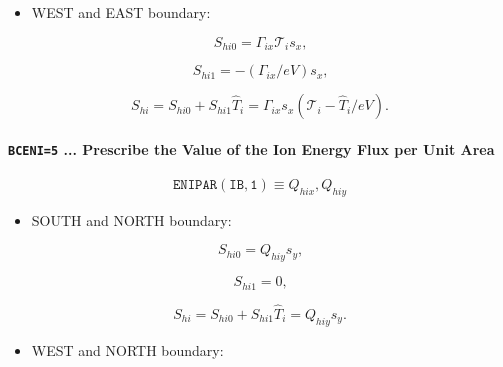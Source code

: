 \documentclass[11pt]{article}
\begin{document}
\bigskip

\begin{itemize}
\item  WEST and EAST boundary:
\end{itemize}

\bigskip

\begin{equation}
S_{hi0}=\mathcal{\Gamma}_{ix}\mathcal{T}_{i}s_{x}\text{,}   \label{c270}
\end{equation}

\begin{equation}
S_{hi1}=-\left( \mathcal{\Gamma}_{ix}/eV\right) s_{x}\text{,}   \label{c271}
\end{equation}

\begin{equation}
S_{hi}=S_{hi0}+S_{hi1}\widehat{T}_{i}=\mathcal{\Gamma}_{ix}s_{x}\left( 
\mathcal{T}_{i}-\widehat{T}_{i}/eV\right) \text{.}   \label{c272}
\end{equation}

\bigskip

\paragraph{\texttt{BCENI=5} ... Prescribe the Value of the Ion Energy Flux
per Unit Area}

\bigskip

\begin{equation*}
\mathtt{ENIPAR(IB,1)}\equiv Q_{hix},Q_{hiy}
\end{equation*}

\bigskip

\begin{itemize}
\item  SOUTH and NORTH boundary:
\end{itemize}

\begin{equation}
S_{hi0}=Q_{hiy}s_{y}\text{,}   \label{c273}
\end{equation}

\begin{equation}
S_{hi1}=0\text{,}   \label{c274}
\end{equation}

\begin{equation}
S_{hi}=S_{hi0}+S_{hi1}\widehat{T}_{i}=Q_{hiy}s_{y}\text{.}   \label{c275}
\end{equation}

\bigskip

\begin{itemize}
\item  WEST and NORTH boundary:
\end{itemize}
\end{document}
